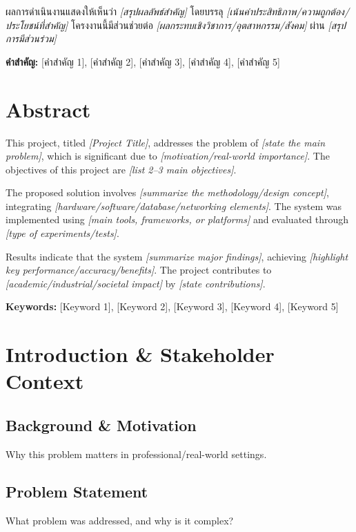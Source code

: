 \documentclass[12pt]{article}
\begin{document}
ผลการดำเนินงานแสดงให้เห็นว่า \textit{[สรุปผลลัพธ์สำคัญ]} โดยบรรลุ \textit{[เน้นค่าประสิทธิภาพ/ความถูกต้อง/ประโยชน์ที่สำคัญ]} โครงงานนี้มีส่วนช่วยต่อ \textit{[ผลกระทบเชิงวิชาการ/อุตสาหกรรม/สังคม]} ผ่าน \textit{[สรุปการมีส่วนร่วม]}

\textbf{คำสำคัญ:} [คำสำคัญ 1], [คำสำคัญ 2], [คำสำคัญ 3], [คำสำคัญ 4], [คำสำคัญ 5]

\section*{Abstract}
This project, titled \textit{[Project Title]}, addresses the problem of \textit{[state the main problem]}, which is significant due to \textit{[motivation/real-world importance]}. The objectives of this project are \textit{[list 2--3 main objectives]}.

The proposed solution involves \textit{[summarize the methodology/design concept]}, integrating \textit{[hardware/software/database/networking elements]}. The system was implemented using \textit{[main tools, frameworks, or platforms]} and evaluated through \textit{[type of experiments/tests]}.

Results indicate that the system \textit{[summarize major findings]}, achieving \textit{[highlight key performance/accuracy/benefits]}. The project contributes to \textit{[academic/industrial/societal impact]} by \textit{[state contributions]}.

\textbf{Keywords:} [Keyword 1], [Keyword 2], [Keyword 3], [Keyword 4], [Keyword 5]

\newpage

\tableofcontents
\newpage


\section{Introduction \& Stakeholder Context}

\subsection{Background \& Motivation}
Why this problem matters in professional/real-world settings.

\subsection{Problem Statement}
What problem was addressed, and why is it complex?
\end{document}
